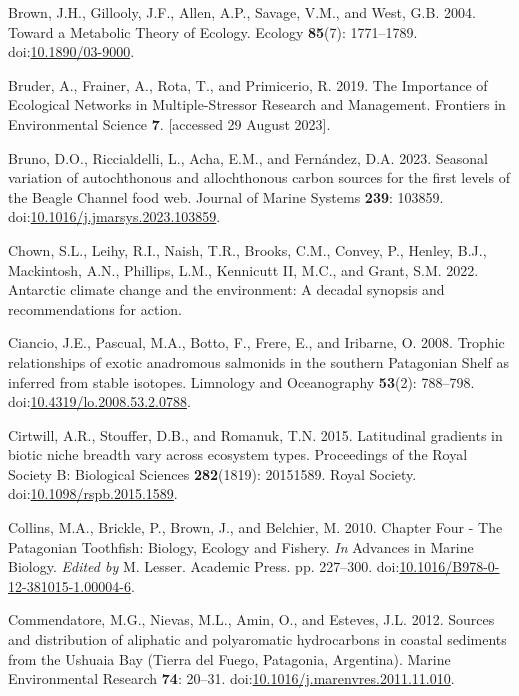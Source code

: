 \documentclass[
]{article}
\newlength{\cslhangindent}
\newenvironment{CSLReferences}[2] %
 {\begin{list}{}{%
  \setlength{\itemindent}{0pt}
  \setlength{\leftmargin}{0pt}
  \setlength{\parsep}{0pt}
  \ifodd #1
   \setlength{\leftmargin}{\cslhangindent}
   \setlength{\itemindent}{-1\cslhangindent}
  \fi
  \setlength{\itemsep}{#2\baselineskip}}}
 {\end{list}}
\begin{document}
\begin{CSLReferences}{1}{0}
Brown, J.H., Gillooly, J.F., Allen, A.P., Savage, V.M., and West, G.B.
2004. Toward a {Metabolic Theory} of {Ecology}. Ecology \textbf{85}(7):
1771--1789. doi:\href{https://doi.org/10.1890/03-9000}{10.1890/03-9000}.

Bruder, A., Frainer, A., Rota, T., and Primicerio, R. 2019. The
{Importance} of {Ecological Networks} in {Multiple-Stressor Research}
and {Management}. Frontiers in Environmental Science \textbf{7}.
{[}accessed 29 August 2023{]}.

Bruno, D.O., Riccialdelli, L., Acha, E.M., and Fernández, D.A. 2023.
Seasonal variation of autochthonous and allochthonous carbon sources for
the first levels of the {Beagle Channel} food web. Journal of Marine
Systems \textbf{239}: 103859.
doi:\href{https://doi.org/10.1016/j.jmarsys.2023.103859}{10.1016/j.jmarsys.2023.103859}.

Chown, S.L., Leihy, R.I., Naish, T.R., Brooks, C.M., Convey, P., Henley,
B.J., Mackintosh, A.N., Phillips, L.M., Kennicutt II, M.C., and Grant,
S.M. 2022. Antarctic climate change and the environment: A decadal
synopsis and recommendations for action.

Ciancio, J.E., Pascual, M.A., Botto, F., Frere, E., and Iribarne, O.
2008. Trophic relationships of exotic anadromous salmonids in the
southern {Patagonian Shelf} as inferred from stable isotopes. Limnology
and Oceanography \textbf{53}(2): 788--798.
doi:\href{https://doi.org/10.4319/lo.2008.53.2.0788}{10.4319/lo.2008.53.2.0788}.

Cirtwill, A.R., Stouffer, D.B., and Romanuk, T.N. 2015. Latitudinal
gradients in biotic niche breadth vary across ecosystem types.
Proceedings of the Royal Society B: Biological Sciences
\textbf{282}(1819): 20151589. Royal Society.
doi:\href{https://doi.org/10.1098/rspb.2015.1589}{10.1098/rspb.2015.1589}.

Collins, M.A., Brickle, P., Brown, J., and Belchier, M. 2010. Chapter
{Four} - {The Patagonian Toothfish}: {Biology}, {Ecology} and {Fishery}.
\emph{In} Advances in {Marine Biology}. \emph{Edited by} M. Lesser.
Academic Press. pp. 227--300.
doi:\href{https://doi.org/10.1016/B978-0-12-381015-1.00004-6}{10.1016/B978-0-12-381015-1.00004-6}.

Commendatore, M.G., Nievas, M.L., Amin, O., and Esteves, J.L. 2012.
Sources and distribution of aliphatic and polyaromatic hydrocarbons in
coastal sediments from the {Ushuaia Bay} ({Tierra} del {Fuego},
{Patagonia}, {Argentina}). Marine Environmental Research \textbf{74}:
20--31.
doi:\href{https://doi.org/10.1016/j.marenvres.2011.11.010}{10.1016/j.marenvres.2011.11.010}.


\end{CSLReferences}
\end{document}
